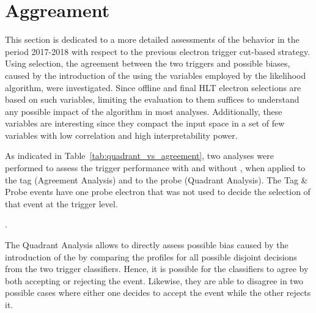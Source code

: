 
\section{\rnn{} Aggreament}%
\label{sec:off_ana}

This section is dedicated to a more detailed assessments of the \rnn{} behavior 
in the period 2017-2018 with respect to the previous electron trigger cut-based strategy.
Using \Zee{} \tnp{} selection, the agreement between the two triggers and
possible biases, caused by the introduction of the \rnn{} using the variables
employed by the likelihood algorithm, were investigated.
Since offline and final HLT electron
selections are based on such variables, limiting the evaluation to them suffices
to understand any possible impact of the \rnn{} algorithm in most analyses.
Additionally, these variables are interesting since they compact the input space
in a set of few variables with low correlation and high interpretability power. 

As indicated in Table~\ref{tab:quadrant_vs_agreement}, two analyses were performed to assess the
trigger performance with and without \rnn{}, when applied to the tag (Agreement Analysis) and
to the probe (Quadrant Analysis). The Tag \& Probe events have one probe electron that was not 
used to decide the selection of that event at the trigger level.


\begin{table}[ht!]\footnotesize
\centering
\caption{Customized \Zee{} \tap{} selection criteria employed in the
agreement and quadrant analyses in 2017-2018 period}.%
\label{tab:quadrant_vs_agreement}
\end{table}

The Quadrant Analysis allows to directly assess possible bias caused by the
introduction of the \rnn{} by comparing the profiles for all possible disjoint
decisions from the two trigger classifiers. Hence, it is possible for the classifiers
to agree by both accepting or rejecting the event. Likewise, they are able to
disagree in two possible cases where either one decides to accept the event
while the other rejects it.

